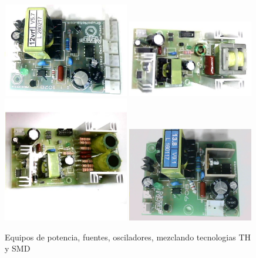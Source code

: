 \documentclass[11pt,a4paper,sans]{moderncv}  %
\begin{document}
   \begin{figure}
      \begin{center}
         \includegraphics[width=0.49\textwidth]{./portfolio/fuente.jpg}
         \includegraphics[width=0.49\textwidth]{./portfolio/cavi.jpeg}
         \includegraphics[width=0.49\textwidth]{./portfolio/trimax.jpeg}
         \includegraphics[width=0.49\textwidth]{./portfolio/fuente_13.jpeg}
      \end{center}
      \caption{Equipos de potencia, fuentes, osciladores, mezclando tecnologias TH y SMD}
      \label{fig:noto1}
   \end{figure}
\end{document}
